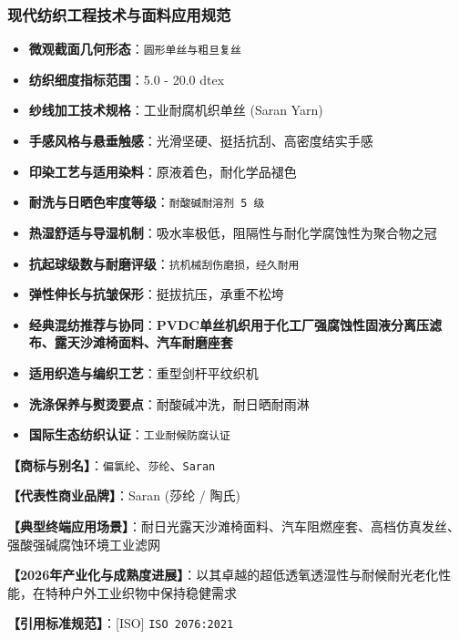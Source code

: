 \documentclass[11pt,openright,twoside,UTF8]{ctexbook}
\begin{document}
\subsubsection*{现代纺织工程技术与面料应用规范}
\begin{itemize} \setlength{\itemsep}{2pt}
    \item \textbf{微观截面几何形态}：\texttt{圆形单丝与粗旦复丝}
    \item \textbf{纺织细度指标范围}：5.0 - 20.0 dtex
    \item \textbf{纱线加工技术规格}：工业耐腐机织单丝 (Saran Yarn)
    \item \textbf{手感风格与悬垂触感}：光滑坚硬、挺括抗刮、高密度结实手感
    \item \textbf{印染工艺与适用染料}：原液着色，耐化学品褪色
    \item \textbf{耐洗与日晒色牢度等级}：\texttt{耐酸碱耐溶剂 5 级}
    \item \textbf{热湿舒适与导湿机制}：吸水率极低，阻隔性与耐化学腐蚀性为聚合物之冠
    \item \textbf{抗起球级数与耐磨评级}：\texttt{抗机械刮伤磨损，经久耐用}
    \item \textbf{弹性伸长与抗皱保形}：挺拔抗压，承重不松垮
    \item \textbf{经典混纺推荐与协同}：\textbf{PVDC单丝机织用于化工厂强腐蚀性固液分离压滤布、露天沙滩椅面料、汽车耐磨座套}
    \item \textbf{适用织造与编织工艺}：重型剑杆平纹织机
    \item \textbf{洗涤保养与熨烫要点}：耐酸碱冲洗，耐日晒耐雨淋
    \item \textbf{国际生态纺织认证}：\texttt{工业耐候防腐认证}
\end{itemize}
\vspace{0.2cm}

\noindent\textbf{【商标与别名】}：\texttt{偏氯纶}、\texttt{莎纶}、\texttt{Saran}\par
\noindent\textbf{【代表性商业品牌】}：Saran (莎纶 / 陶氏)\par
\noindent\textbf{【典型终端应用场景】}：耐日光露天沙滩椅面料、汽车阻燃座套、高档仿真发丝、强酸强碱腐蚀环境工业滤网\par
\noindent\textbf{【2026年产业化与成熟度进展】}：以其卓越的超低透氧透湿性与耐候耐光老化性能，在特种户外工业织物中保持稳健需求\par
\noindent\textbf{【引用标准规范】}：[ISO] \texttt{ISO 2076:2021}\par
\vspace{0.5cm}
\end{document}
